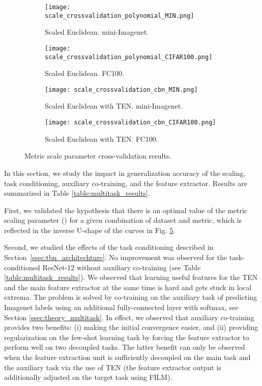 \documentclass{article}
\begin{document}
\begin{figure}[t]


    \centering
    \begin{subfigure}[t]{0.49\textwidth}
        \texttt{[image: scale\_crossvalidation\_polynomial\_MIN.png]}
        \caption{Scaled Euclidean. mini-Imagenet.}
        \label{fig:scaled_euclidean_miniimagenet}
    \end{subfigure}
    \begin{subfigure}[t]{0.49\textwidth}
        \texttt{[image: scale\_crossvalidation\_polynomial\_CIFAR100.png]}
        \caption{Scaled Euclidean. FC100.}
        \label{fig:scaled_euclidean_cifar100}
    \end{subfigure}
    \begin{subfigure}[t]{0.49\textwidth}
        \texttt{[image: scale\_crossvalidation\_cbn\_MIN.png]}
        \caption{Scaled Euclidean with TEN. mini-Imagenet.}
        \label{fig:scaled_euclidean_with_tbn_miniimagenet}
    \end{subfigure}
    \begin{subfigure}[t]{0.49\textwidth}
        \texttt{[image: scale\_crossvalidation\_cbn\_CIFAR100.png]}
        \caption{Scaled Euclidean with TEN. FC100.}
        \label{fig:scaled_euclidean_with_tbn_cifar100}
    \end{subfigure}
    \caption{Metric scale parameter  cross-validation results.}
    \label{fig:metric_scaling}
\end{figure}







In this section, we study the impact in generalization accuracy of the scaling, task conditioning, auxiliary co-training, and the feature extractor. Results are summarized in Table \ref{table:multitask_results}.

First, we validated the hypothesis that there is an optimal value of the metric scaling parameter () for a given combination of dataset and metric, which is reflected in the inverse U-shape of the curves in Fig. \ref{fig:metric_scaling}.

Second, we studied the effects of the task conditioning described in Section~\ref{ssec:tbn_architechture}. No improvement was observed for the task-conditioned ResNet-12 without auxiliary co-training (see Table \ref{table:multitask_results}). We observed that learning useful features for the TEN and the main feature extractor at the same time is hard and gets stuck in local extrema. The problem is solved by co-training on the auxiliary task of predicting Imagenet labels using an additional fully-connected layer with softmax, see Section \ref{ssec:theory_multitask}. In effect, we observed that auxiliary co-training provides two benefits: (i) making the initial convergence easier, and (ii) providing regularization on the few-shot learning task by forcing the feature extractor to perform well on two decoupled tasks. The latter benefit can only be observed when the feature extraction unit is sufficiently decoupled on the main task and the auxiliary task via the use of TEN (the feature extractor output is additionally adjusted on the target task using FILM).
\end{document}
